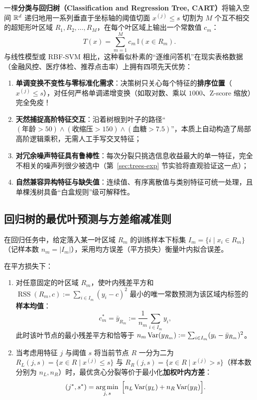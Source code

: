一棵\textbf{分类与回归树（Classification and Regression Tree, CART）}将输入空间 $\mathbb{R}^d$ 递归地用一系列垂直于坐标轴的阈值切面 $x^{(j)} \le s$ 切割为 $M$ 个互不相交的超矩形叶区域 $R_1, R_2, \dots, R_M$，在每个叶区域上输出一个常数值 $c_m$：
\begin{equation}\label{eq:cart-model}
  T(x) = \sum_{m=1}^{M} c_m \,\mathbb{I}(x \in R_m).
\end{equation}
与线性模型或 RBF-SVM 相比，这种看似朴素的“逐维问答机”在现实表格数据（金融风控、医疗体检、推荐点击率）上拥有四项先天优势：
\begin{enumerate}
  \item \textbf{单调变换不变性与零标准化需求}：决策树只关心每个特征的\textbf{排序位置}（$x^{(j)} \le s$），对任何严格单调递增变换（如取对数、乘以 $1000$、Z-score 缩放）完全免疫！
  \item \textbf{天然捕捉高阶特征交互}：沿着树根到叶子的路径“$(\text{年龄}>50) \land (\text{收缩压}>150) \land (\text{血糖}>7.5)$”，本质上自动构造了局部高阶逻辑乘积，无需人工手写交叉特征；
  \item \textbf{对冗余噪声特征具有鲁棒性}：每次分裂只挑选信息收益最大的单一特征，完全不相关的噪声列很少被选中（第~\ref{sec:trees-exp} 节实验将直观验证这一点）；
  \item \textbf{自然兼容异构特征与缺失值}：连续值、有序离散值与类别特征可统一处理，且单棵浅树具备“白盒规则”级可解释性。
\end{enumerate}

\subsection{回归树的最优叶预测与方差缩减准则}

在回归任务中，给定落入某一叶区域 $R_m$ 的训练样本下标集 $I_m = \{i \mid x_i \in R_m\}$（记样本数 $n_m = |I_m|$），采用均方误差（平方损失）衡量叶内拟合误差。

\begin{thmBox}
\begin{proposition}[回归树叶节点的最优常数预测与贪心分裂目标]\label{prop:cart-reg}
在平方损失下：
\begin{enumerate}
  \item 对任意固定的叶区域 $R_m$，使叶内残差平方和 $\operatorname{RSS}(R_m, c) := \sum_{i \in I_m}(y_i - c)^2$ 最小的唯一常数预测为该区域内标签的\textbf{样本均值}：
  \[
    c_m^* = \bar{y}_{R_m} := \frac{1}{n_m}\sum_{i \in I_m} y_i,
  \]
  此时该叶节点的最小残差平方和恰等于 $n_m \operatorname{Var}(y_{R_m}) := \sum_{i \in I_m}(y_i - \bar{y}_{R_m})^2$。
  \item 当考虑用特征 $j$ 与阈值 $s$ 将当前节点 $R$ 一分为二为 $R_L(j, s) = \{x \in R \mid x^{(j)} \le s\}$ 与 $R_R(j, s) = \{x \in R \mid x^{(j)} > s\}$（样本数分别为 $n_L, n_R$）时，最优贪心分裂等价于最小化\textbf{加权叶内方差}：
  \begin{equation}\label{eq:cart-reg-split}
    (j^*, s^*) = \operatorname*{arg\,min}_{j,\, s}\; \Big[ n_L \operatorname{Var}(y_L) + n_R \operatorname{Var}(y_R) \Big].
  \end{equation}
\end{enumerate}
\end{proposition}
\end{thmBox}


